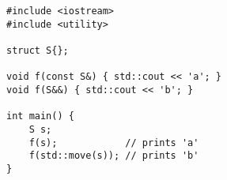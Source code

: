 \begin{lstlisting}[title=\href{https://godbolt.org/z/aKbGEc}{\texttt{godbolt.org/z/aKbGEc}}]
#include <iostream>
#include <utility>

struct S{};

void f(const S&) { std::cout << 'a'; }
void f(S&&) { std::cout << 'b'; }

int main() {
    S s;
    f(s);            // prints 'a'
    f(std::move(s)); // prints 'b'
}
\end{lstlisting}
